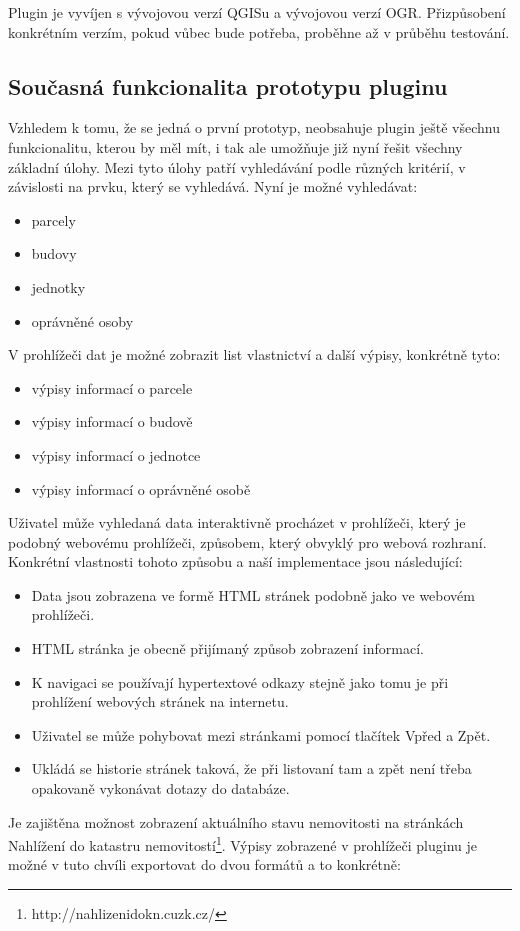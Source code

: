 \documentclass[a4paper,10pt]{article}
\begin{document}
Plugin je vyvíjen s vývojovou verzí QGISu a vývojovou verzí OGR.
Přizpůsobení konkrétním verzím, pokud vůbec bude potřeba, proběhne až v průběhu testování.

\subsection{Současná funkcionalita prototypu pluginu}
Vzhledem k tomu, že se jedná o první prototyp, neobsahuje plugin ještě všechnu funkcionalitu, kterou by měl mít,
i tak ale umožňuje již nyní řešit všechny základní úlohy.
Mezi tyto úlohy patří vyhledávání podle různých kritérií, v závislosti na prvku, který se vyhledává.
Nyní je možné vyhledávat:
\begin{itemize}
    \item parcely
    \item budovy
    \item jednotky
    \item oprávněné osoby
\end{itemize}

V prohlížeči dat je možné zobrazit list vlastnictví a další výpisy, konkrétně tyto:
\begin{itemize}
        \item výpisy informací o parcele
        \item výpisy informací o budově
        \item výpisy informací o jednotce
        \item výpisy informací o oprávněné osobě
\end{itemize}
Uživatel může vyhledaná data interaktivně procházet v prohlížeči, který je podobný webovému prohlížeči,
způsobem, který obvyklý pro webová rozhraní.
Konkrétní vlastnosti tohoto způsobu a naší implementace jsou následující:
\begin{itemize}
\item Data jsou zobrazena ve formě HTML stránek podobně jako ve webovém prohlížeči.
\item HTML stránka je obecně přijímaný způsob zobrazení informací.
\item K navigaci se používají hypertextové odkazy stejně jako tomu je při prohlížení webových stránek na internetu.
\item Uživatel se může pohybovat mezi stránkami pomocí tlačítek Vpřed a Zpět.
\item Ukládá se historie stránek taková, že při listovaní tam a zpět není třeba opakovaně vykonávat dotazy do databáze.
\end{itemize}
Je zajištěna možnost zobrazení aktuálního stavu nemovitosti na stránkách Nahlížení do katastru nemovitostí\footnote{http://nahlizenidokn.cuzk.cz/}.
Výpisy zobrazené v prohlížeči pluginu je možné v tuto chvíli exportovat do dvou formátů a to konkrétně:
\end{document}
